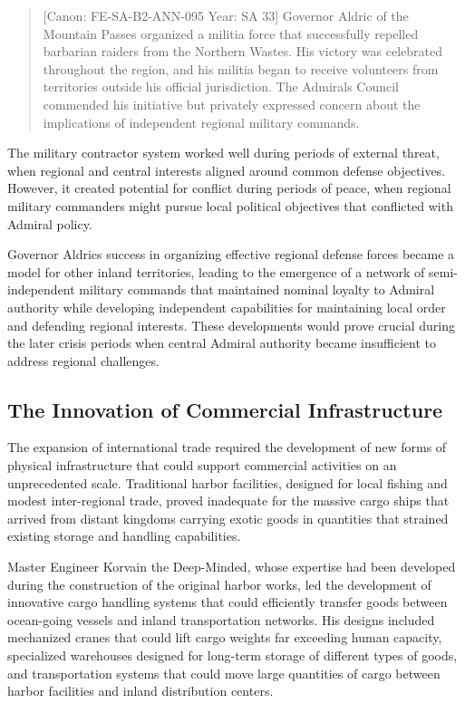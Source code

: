 \begin{quote}
{[}Canon: FE-SA-B2-ANN-095 \textbar{} Year: SA 33{]} Governor Aldric of
the Mountain Passes organized a militia force that successfully repelled
barbarian raiders from the Northern Wastes. His victory was celebrated
throughout the region, and his militia began to receive volunteers from
territories outside his official jurisdiction. The
Admiral\textquotesingle s Council commended his initiative but privately
expressed concern about the implications of independent regional
military commands.
\end{quote}

The military contractor system worked well during periods of external
threat, when regional and central interests aligned around common
defense objectives. However, it created potential for conflict during
periods of peace, when regional military commanders might pursue local
political objectives that conflicted with Admiral policy.

Governor Aldric\textquotesingle s success in organizing effective
regional defense forces became a model for other inland territories,
leading to the emergence of a network of semi-independent military
commands that maintained nominal loyalty to Admiral authority while
developing independent capabilities for maintaining local order and
defending regional interests. These developments would prove crucial
during the later crisis periods when central Admiral authority became
insufficient to address regional challenges.

\subsection{The Innovation of Commercial
Infrastructure}\label{the-innovation-of-commercial-infrastructure}

The expansion of international trade required the development of new
forms of physical infrastructure that could support commercial
activities on an unprecedented scale. Traditional harbor facilities,
designed for local fishing and modest inter-regional trade, proved
inadequate for the massive cargo ships that arrived from distant
kingdoms carrying exotic goods in quantities that strained existing
storage and handling capabilities.

Master Engineer Korvain the Deep-Minded, whose expertise had been
developed during the construction of the original harbor works, led the
development of innovative cargo handling systems that could efficiently
transfer goods between ocean-going vessels and inland transportation
networks. His designs included mechanized cranes that could lift cargo
weights far exceeding human capacity, specialized warehouses designed
for long-term storage of different types of goods, and transportation
systems that could move large quantities of cargo between harbor
facilities and inland distribution centers.

